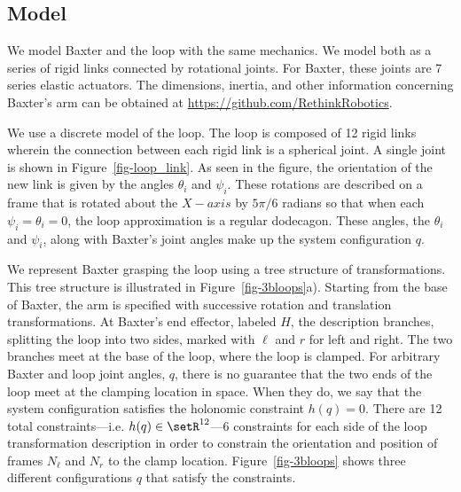 \documentclass[letterpaper, 10pt, conference]{ieeeconf}
\begin{document}
\subsection{Model}
We model Baxter and the loop with the same mechanics.  We model both as a series of rigid links connected by rotational joints.  For Baxter, these joints are 7 series elastic actuators.  The dimensions,  inertia, and other information concerning Baxter's arm can be obtained at \url{https://github.com/RethinkRobotics}.  

\begin{figure*}
\centering
\def\svgwidth{.97\textwidth}%

\caption{Illustration of the spherical joint $i$ connecting links $i$ and $i+1$.  The joint is a rotation of $\theta_i$ radians about the $X$-axis followed by a rotation of $\psi_i$ radians about the $Y$-axis. }
\label{fig-loop_link}
\end{figure*}

We use a discrete model of the loop.  The loop is composed of 12 rigid links wherein the connection between each rigid link is a spherical joint.  A single joint is shown in Figure~\ref{fig-loop_link}.  As seen in the figure, the orientation of the new link is given by the angles $\theta_i$ and $\psi_i$.  These rotations are described on a frame that is rotated about the $X-axis$ by $5\pi/6$ radians so that when each $\psi_i = \theta_i = 0$, the loop approximation is a regular dodecagon.  These angles, the $\theta_i$ and $\psi_i$, along with Baxter's joint angles make up the system configuration $q$.  

We represent Baxter grasping the loop using a tree structure of transformations.  This tree structure is illustrated in Figure~\ref{fig-3bloops}a).  Starting from the base of Baxter, the arm is specified with successive rotation and translation transformations.  At Baxter's end effector, labeled $H$, the description branches, splitting the loop into two sides, marked with $\ell$ and $r$ for left and right.  The two branches meet at the base of the loop, where the loop is clamped.  For arbitrary Baxter and loop joint angles, $q$, there is no guarantee that the two ends of the loop meet at the clamping location in space.  When they do, we say that the system configuration satisfies the holonomic constraint $h(q) = 0$.  There are 12 total constraints---i.e. $h(q)\in\setR^{12}$---6 constraints for each side of the loop transformation description in order to constrain the orientation and position of frames $N_\ell$ and $N_r$ to the clamp location.  Figure~\ref{fig-3bloops} shows three different configurations $q$ that satisfy the constraints.
\end{document}

